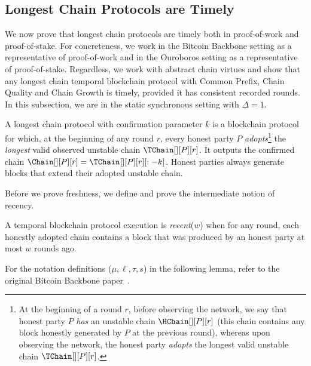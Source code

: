 \subsection{Longest Chain Protocols are Timely}

We now prove that longest chain protocols are timely both in proof-of-work and proof-of-stake.
For concreteness, we work in the Bitcoin Backbone setting
as a representative of proof-of-work and in the Ouroboros setting
as a representative of proof-of-stake.
Regardless, we work with abstract chain virtues
and show that any longest chain
temporal blockchain protocol with Common Prefix,
Chain Quality and Chain Growth is timely,
provided it has consistent recorded rounds.
In this subsection, we are in the
static synchronous setting with $\Delta = 1$.

\begin{definition}
  A longest chain protocol with confirmation parameter $k$
  is a blockchain protocol for which,
  at the beginning of any round $r$, every honest party $P$ \emph{adopts}\footnote{
    At the beginning of a round $r$, before observing the network, we say that
    honest party $P$ \emph{has} an unstable chain $\HChain[][P][r]$ (this chain
    contains any block honestly generated by $P$ at the previous round), whereas
    upon observing the network, the honest party \emph{adopts} the longest
    valid unstable chain $\TChain[][P][r]$.
  }
  the \emph{longest} valid observed unstable chain $\TChain[][P][r]$. It outputs the
  confirmed chain $\Chain[][P][r] = \TChain[][P][r][:-k]$.
  Honest parties always generate blocks that extend their adopted unstable chain.
\end{definition}

Before we prove freshness, we define and prove the
intermediate notion of recency.

\begin{definition}[Recency]
  A temporal blockchain protocol execution is \emph{recent}($w$)
  when for any round, each honestly adopted chain
  contains a block that was produced by an honest party
  at most $w$ rounds ago.
\end{definition}

For the notation definitions ($\mu, \ell, \tau, s$)
in the following lemma, refer to the original Bitcoin
Backbone paper~\cite{backbone-new}.

